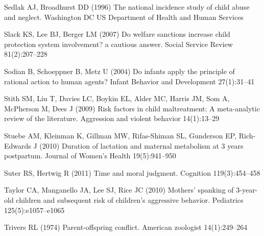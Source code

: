 \begin{thebibliography}{50}
Sedlak AJ, Broadhurst DD (1996) The national incidence study of child abuse and
  neglect. Washington DC US Department of Health and Human Services

Slack KS, Lee BJ, Berger LM (2007) Do welfare sanctions increase child
  protection system involvement? a cautious answer. Social Service Review
  81(2):207--228

Sodian B, Schoeppner B, Metz U (2004) Do infants apply the principle of
  rational action to human agents? Infant Behavior and Development 27(1):31--41

Stith SM, Liu T, Davies LC, Boykin EL, Alder MC, Harris JM, Som A, McPherson M,
  Dees J (2009) Risk factors in child maltreatment: A meta-analytic review of
  the literature. Aggression and violent behavior 14(1):13--29

Stuebe AM, Kleinman K, Gillman MW, Rifas-Shiman SL, Gunderson EP, Rich-Edwards
  J (2010) Duration of lactation and maternal metabolism at 3 years postpartum.
  Journal of Women's Health 19(5):941--950

Suter RS, Hertwig R (2011) Time and moral judgment. Cognition 119(3):454--458

Taylor CA, Manganello JA, Lee SJ, Rice JC (2010) Mothers' spanking of
  3-year-old children and subsequent risk of children's aggressive behavior.
  Pediatrics 125(5):e1057--e1065

Trivers RL (1974) Parent-offspring conflict. American zoologist 14(1):249--264

\end{thebibliography}
% 
% 



